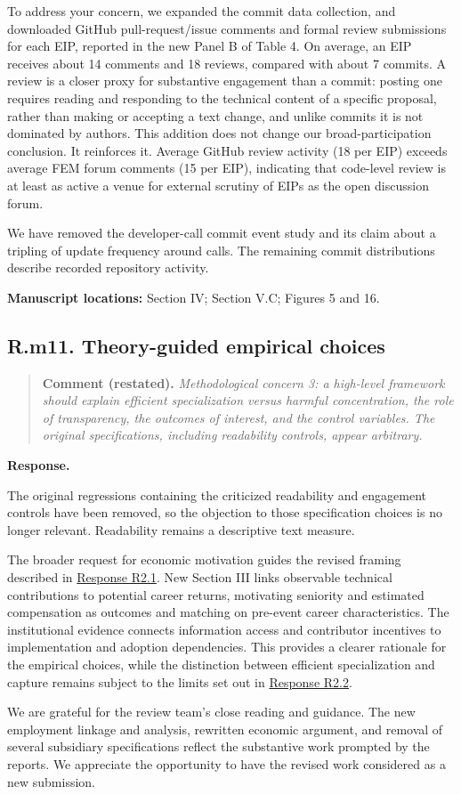 \documentclass[11pt,letterpaper]{article}
\newcommand{\point}[3]{%
  \Needspace{7\baselineskip}
  \subsection*{#1. #2}\phantomsection\label{pt:#1}%
  \begin{quote}\small\textbf{Comment (restated).} \textit{#3}\end{quote}%
  \textbf{Response.}\enspace\ignorespaces}
\newcommand{\locations}[1]{\par{\small\textbf{Manuscript locations:} #1.}\par}
\newcommand{\replyref}[1]{\hyperref[pt:#1]{Response #1}}
\begin{document}
To address your concern, we expanded the commit data collection, and downloaded GitHub pull-request/issue comments and formal review submissions for each EIP, reported in the new Panel B of Table 4. On average, an EIP receives about 14 comments and 18 reviews, compared with about 7 commits. A review is a closer proxy for substantive engagement than a commit: posting one requires reading and responding to the technical content of a specific proposal, rather than making or accepting a text change, and unlike commits it is not dominated by authors. This addition does not change our broad-participation conclusion. It reinforces it. Average GitHub review activity (18 per EIP) exceeds average FEM forum comments (15 per EIP), indicating that code-level review is at least as active a venue for external scrutiny of EIPs as the open discussion forum.

We have removed the developer-call commit event study and its claim about a tripling of update frequency around calls. The remaining commit distributions describe recorded repository activity. 



\locations{Section IV; Section V.C; Figures 5 and 16}







\point{R.m11}{Theory-guided empirical choices}{Methodological concern 3: a high-level framework should explain efficient specialization versus harmful concentration, the role of transparency, the outcomes of interest, and the control variables. The original specifications, including readability controls, appear arbitrary.}

The original regressions containing the criticized readability and engagement controls have been removed, so the objection to those specification choices is no longer relevant. Readability remains a descriptive text measure.

The broader request for economic motivation guides the revised framing described in \replyref{R2.1}. New Section III links observable technical contributions to potential career returns, motivating seniority and estimated compensation as outcomes and matching on pre-event career characteristics. The institutional evidence connects information access and contributor incentives to implementation and adoption dependencies. This provides a clearer rationale for the empirical choices, while the distinction between efficient specialization and capture remains subject to the limits set out in \replyref{R2.2}.


\bigskip
We are grateful for the review team's close reading and guidance. The new employment linkage and analysis, rewritten economic argument, and removal of several subsidiary specifications reflect the substantive work prompted by the reports. We appreciate the opportunity to have the revised work considered as a new submission.


\newpage


\end{document}
